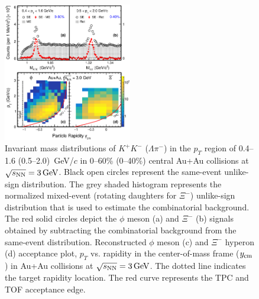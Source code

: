 \documentclass[%
 reprint,	
showpacs,
 amsmath,amssymb,
 aps,
 superscriptaddress,
]{revtex4-1}
\begin{document}
\begin{figure}
\centering
\hspace*{-4mm}
\includegraphics[width=0.50\textwidth]{fig/fig1_signal.eps}
  \caption{Invariant mass distributions of $K^+K^-$ ($\Lambda\pi^-$) in the $p_T$ region of 0.4--1.6 (0.5--2.0) \,GeV/$c$ in 0--60\% (0--40\%) central Au+Au collisions at ${\sqrt{s_{\rm NN}} = \rm{3\,GeV}}$. Black open circles represent the same-event unlike-sign distribution. The grey shaded histogram represents the normalized mixed-event (rotating daughters for $\Xi^-$) unlike-sign distribution that is used to estimate the combinatorial background. The red solid circles depict the $\phi$ meson (a) and $\Xi^-$ (b) signals obtained by subtracting the combinatorial background from the same-event distribution. Reconstructed $\phi$ meson (c) and $\Xi^-$ hyperon (d) acceptance plot, $p_T$ vs. rapidity in the center-of-mass frame ($y_{\rm cm}$) in Au+Au collisions at ${\sqrt{s_{\rm NN}} = \rm{3\,GeV}}$. The dotted line indicates the target rapidity location. The red curve represents the TPC and TOF acceptance edge.}
\label{fig:phiSignal} 
\end{figure}
\end{document}
